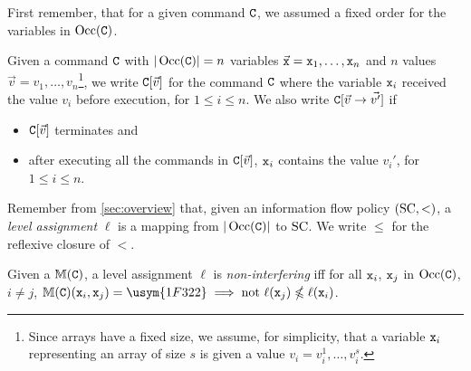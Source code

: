 \documentclass[conference]{IEEEtran}
\newcommand{\vi}{\usym{1F322}} %
\begin{document}
First remember, that for a given command $\mathtt{C}$, we assumed a fixed order for the variables in \(\operatorname{Occ}(\mathtt{C})\).

\begin{definition}
	Given a command \(\mathtt{C}\) with \(|\operatorname{Occ}(\mathtt{C})|=n\) variables \(\vec{\mathtt{x}}=\mathtt{x}_1, \hdots, \mathtt{x}_n\) and \(n\) values \(\vec{v}=v_1, \hdots, v_n\)\footnote{Since arrays have a fixed size, we assume, for simplicity, that a variable $\mathtt{x}_i$ representing an array of size $s$ is given a value $v_i = v_i^1, \hdots, v_i^s$.}, we write \(\comm{C}[%
		\vec{v}]\) for the command \(\mathtt{C}\) where the variable \(\mathtt{x}_i\) received the value \(v_i\) before execution, for \(1 \leqslant i \leqslant n\).
We also write \(\mathtt{C}[\vec{v} \rightarrow \vec{v'}]\) if \begin{itemize}
		\item \(\mathtt{C}[\vec{v}]\) terminates and
		\item after executing all the commands in \(\mathtt{C}[\vec{v}]\), \(\mathtt{x}_i\) contains the value \(v_i'\), for \(1 \leqslant i \leqslant n\).
	\end{itemize}
\end{definition}

Remember from \autoref{sec:overview} that, given an information flow policy \((\mathrm{SC}, <)\), a \emph{level assignment} \(\ell\) is a mapping from \(|\operatorname{Occ}(\mathtt{C})|\) to \(\mathrm{SC}\).
We write \(\leqslant\) for the reflexive closure of \(<\).



\begin{definition}
	\label{def:level-ni}
	 Given a %
	 \SFM $\mathbb{M}(\mathtt{C})$, a level assignment \(\ell\) is \emph{non-interfering} iff for all \(\mathtt{x}_i\), \(\mathtt{x}_j\) in \(\operatorname{Occ}(\mathtt{C})\), \(i \neq j\), \(\sfm{C}(\comm{x}_i, \comm{x}_j)= \vi \implies \text{not } \ell(\comm{x}_j) \nleqslant \ell(\comm{x}_i)\).
\end{definition}
\end{document}
